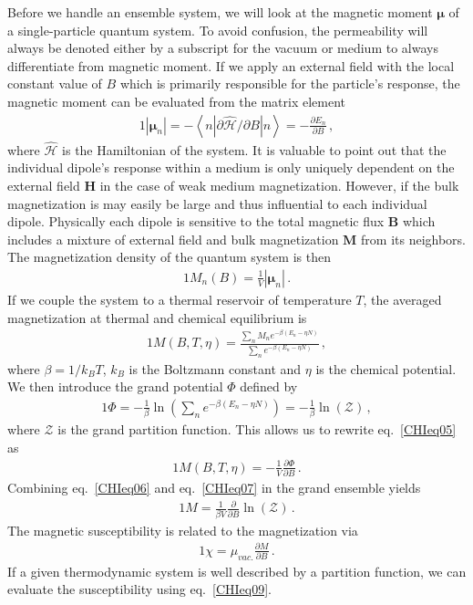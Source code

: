 \documentclass[
aps,
pra,
showpacs,
preprintnumbers,
amsmath,
amssymb,
footinbib
]{revtex4-2}
\begin{document}
Before we handle an ensemble system, we will look at the magnetic moment $\boldsymbol{\mu}$ of a single-particle quantum system. To avoid confusion, the permeability will always be denoted either by a subscript for the vacuum or medium to always differentiate from magnetic moment. If we apply an external field with the local constant value of $B$ which is primarily responsible for the particle's response, the magnetic moment can be evaluated from the matrix element
\begin{alignat}{1}
  \label{CHIeq03} \left|\boldsymbol{\mu}_{n}\right|=-\left\langle n\left|\partial\hat{\mathcal{H}}/\partial B\right|n\right\rangle=-\frac{\partial E_{n}}{\partial B}\,,
\end{alignat}
where $\hat{\mathcal{H}}$ is the Hamiltonian of the system. It is valuable to point out that the individual dipole's response within a medium is only uniquely dependent on the external field $\textbf{H}$ in the case of weak medium magnetization. However, if the bulk magnetization is may easily be large and thus influential to each individual dipole. Physically each dipole is sensitive to the total magnetic flux $\textbf{B}$ which includes a mixture of external field and bulk magnetization $\textbf{M}$ from its neighbors. The magnetization density of the quantum system is then
\begin{alignat}{1}
  \label{CHIeq04} M_{n}(B)=\frac{1}{V}\left|\boldsymbol{\mu}_{n}\right|\,.
\end{alignat}
If we couple the system to a thermal reservoir of temperature $T$, the averaged magnetization at thermal and chemical equilibrium is
\begin{alignat}{1}
  \label{CHIeq05} M(B,T,\eta)=\frac{\sum_{n}M_{n}e^{-\beta (E_{n}-\eta N)}}{\sum_{n}e^{-\beta (E_{n}-\eta N)}}\,,
\end{alignat}
where $\beta=1/k_{B}T$, $k_{B}$ is the Boltzmann constant and $\eta$ is the chemical potential. We then introduce the grand potential $\Phi$ defined by
\begin{alignat}{1}
  \label{CHIeq06} \Phi=-\frac{1}{\beta}\ln\left({\sum_{n}e^{-\beta (E_{n}-\eta N)}}\right)=-\frac{1}{\beta}\ln\left(\mathcal{Z}\right)\,,
\end{alignat}
where $\mathcal{Z}$ is the grand partition function. This allows us to rewrite eq.~\eqref{CHIeq05} as
\begin{alignat}{1}
  \label{CHIeq07} M(B,T,\eta)=-\frac{1}{V}\frac{\partial \Phi}{\partial B}\,.
\end{alignat}
Combining eq.~\eqref{CHIeq06} and eq.~\eqref{CHIeq07} in the grand ensemble yields
\begin{alignat}{1}
  \label{Mag} M=\frac{1}{\beta V}\frac{\partial}{\partial B}\ln\left(\mathcal{Z}\right)\,.
\end{alignat}
The magnetic susceptibility is related to the magnetization via
\begin{alignat}{1}
  \label{CHIeq09} \chi=\mu_{vac.}\frac{\partial M}{\partial B}\,.
\end{alignat}
If a given thermodynamic system is well described by a partition function, we can evaluate the susceptibility using eq.~\eqref{CHIeq09}.
\end{document}

